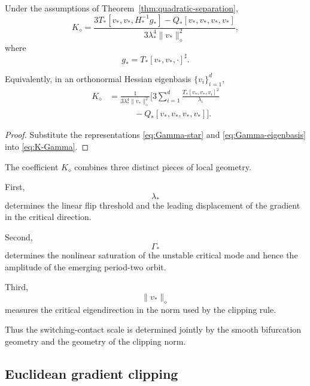 \begin{corollary}
\label{cor:explicit-K}
Under the assumptions of
Theorem~\ref{thm:quadratic-separation},
\begin{equation}
\boxed{
K_\diamond
=
\frac{
3T_*[v_*,v_*,H_*^{-1}g_*]
-
Q_*[v_*,v_*,v_*,v_*]
}{
3\lambda_*^4
\|v_*\|_\diamond^2
},
}
\label{eq:explicit-K-tensor}
\end{equation}
where
\[
g_*
=
T_*[v_*,v_*,\cdot]^\sharp.
\]

Equivalently, in an orthonormal Hessian eigenbasis
$\{v_i\}_{i=1}^d$,
\begin{align}
K_\diamond
&=
\frac{1}{
3\lambda_*^4
\|v_*\|_\diamond^2
}
\Bigg[
3
\sum_{i=1}^d
\frac{
T_*[v_*,v_*,v_i]^2
}{
\lambda_i
}
\nonumber\\
&\hspace{3em}
-
Q_*[v_*,v_*,v_*,v_*]
\Bigg].
\label{eq:explicit-K-eigenbasis}
\end{align}
\end{corollary}

\begin{proof}
Substitute the representations
\eqref{eq:Gamma-star} and
\eqref{eq:Gamma-eigenbasis}
into \eqref{eq:K-Gamma}.
\end{proof}

\begin{remark}
\label{rem:K-interpretation}
The coefficient $K_\diamond$ combines three distinct pieces of
local geometry.

First,
\[
\lambda_*
\]
determines the linear flip threshold and the leading displacement of
the gradient in the critical direction.

Second,
\[
\Gamma_*
\]
determines the nonlinear saturation of the unstable critical mode
and hence the amplitude of the emerging period-two orbit.

Third,
\[
\|v_*\|_\diamond
\]
measures the critical eigendirection in the norm used by the
clipping rule.

Thus the switching-contact scale is determined jointly by the
smooth bifurcation geometry and the geometry of the clipping norm.
\end{remark}

\subsection{Euclidean gradient clipping}
\label{subsec:euclidean-separation}

